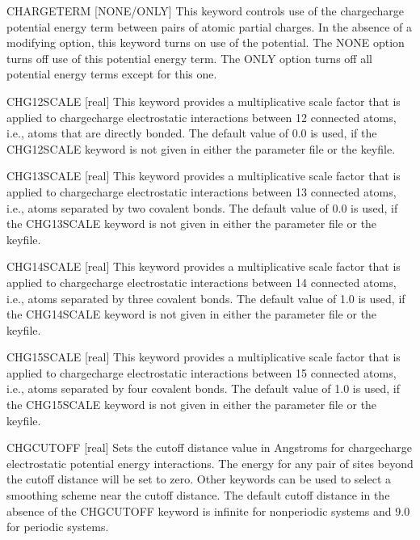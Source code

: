 \documentclass[letterpaper,11pt,english]{sphinxmanual}
\begin{document}
CHARGETERM {[}NONE/ONLY{]}     This keyword controls use of the charge\sphinxhyphen{}charge potential energy term between pairs of atomic partial charges. In the absence of a modifying option, this keyword turns on use of the potential. The NONE option turns off use of this potential energy term. The ONLY option turns off all potential energy terms except for this one.

CHG\sphinxhyphen{}12\sphinxhyphen{}SCALE {[}real{]}     This keyword provides a multiplicative scale factor that is applied to charge\sphinxhyphen{}charge electrostatic interactions between 1\sphinxhyphen{}2 connected atoms, i.e., atoms that are directly bonded. The default value of 0.0 is used, if the CHG\sphinxhyphen{}12\sphinxhyphen{}SCALE keyword is not given in either the parameter file or the keyfile.

CHG\sphinxhyphen{}13\sphinxhyphen{}SCALE {[}real{]}     This keyword provides a multiplicative scale factor that is applied to charge\sphinxhyphen{}charge electrostatic interactions between 1\sphinxhyphen{}3 connected atoms, i.e., atoms separated by two covalent bonds. The default value of 0.0 is used, if the CHG\sphinxhyphen{}13\sphinxhyphen{}SCALE keyword is not given in either the parameter file or the keyfile.

CHG\sphinxhyphen{}14\sphinxhyphen{}SCALE {[}real{]}     This keyword provides a multiplicative scale factor that is applied to charge\sphinxhyphen{}charge electrostatic interactions between 1\sphinxhyphen{}4 connected atoms, i.e., atoms separated by three covalent bonds. The default value of 1.0 is used, if the CHG\sphinxhyphen{}14\sphinxhyphen{}SCALE keyword is not given in either the parameter file or the keyfile.

CHG\sphinxhyphen{}15\sphinxhyphen{}SCALE {[}real{]}     This keyword provides a multiplicative scale factor that is applied to charge\sphinxhyphen{}charge electrostatic interactions between 1\sphinxhyphen{}5 connected atoms, i.e., atoms separated by four covalent bonds. The default value of 1.0 is used, if the CHG\sphinxhyphen{}15\sphinxhyphen{}SCALE keyword is not given in either the parameter file or the keyfile.

CHG\sphinxhyphen{}CUTOFF {[}real{]}     Sets the cutoff distance value in Angstroms for charge\sphinxhyphen{}charge electrostatic potential energy interactions. The energy for any pair of sites beyond the cutoff distance will be set to zero. Other keywords can be used to select a smoothing scheme near the cutoff distance. The default cutoff distance in the absence of the CHG\sphinxhyphen{}CUTOFF keyword is infinite for nonperiodic systems and 9.0 for periodic systems.
\end{document}
